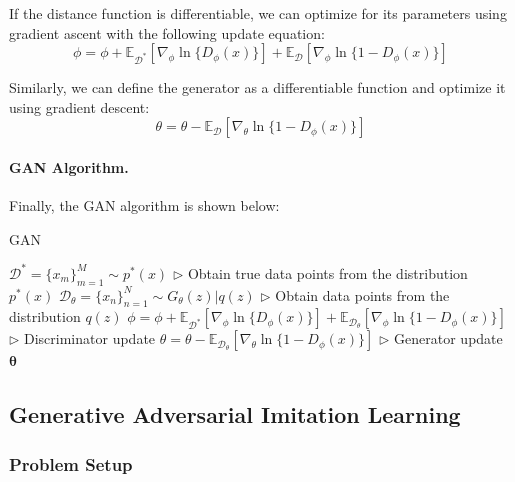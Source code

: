 \documentclass[11pt]{article}
\begin{document}
If the distance function is differentiable, we can optimize for its parameters using gradient ascent with the following update equation:
\begin{equation}
    \phi = \phi + \mathbb{E}_{\mathcal{D}^\ast} [\nabla_\phi \ln \{D_{\phi}(x)\} ]
    + \mathbb{E}_{\mathcal{D}}[\nabla_\phi \ln\{1 - D_\phi(x)\}]
\end{equation}

Similarly, we can define the generator as a differentiable function and optimize it using gradient descent:
\begin{equation}
    \theta = \theta - \mathbb{E}_{\mathcal{D}}[\nabla_\theta \ln\{1 - D_\phi(x)\}]
\end{equation}

\paragraph{GAN Algorithm.}

Finally, the GAN algorithm is shown below:

\begin{algorithm}[H]
    \label{algo:gan}
    \caption{GAN}
    \begin{algorithmic}[1]
    \State $\mathcal{D}^\ast = \{ x_m\}_{m=1}^M \sim p^\ast (x)$  \hfill $\triangleright$ Obtain true data points from the distribution $p^\ast(x)$
    \State $\mathcal{D}_\theta = \{ x_n\}_{n=1}^N \sim G_\theta (z) | q(z)$ \hfill $\triangleright$ Obtain data points from the distribution $q(z)$ 
    \State $\phi = \phi + \mathbb{E}_{\mathcal{D}^\ast} [\nabla_\phi \ln \{D_{\phi}(x)\} ]
    + \mathbb{E}_{\mathcal{D}_\theta}[\nabla_\phi \ln\{1 - D_\phi(x)\}]$ \hfill $\triangleright$ Discriminator update 
    \State $\theta = \theta - \mathbb{E}_{\mathcal{D}_\theta}[\nabla_\theta \ln\{1 - D_\phi(x)\}]$ \hfill $\triangleright$ Generator update 
    \EndFor \\
    \Return $\boldsymbol{\theta}$
    \EndFunction
    \end{algorithmic}
\end{algorithm}

\subsection{Generative Adversarial Imitation Learning}

\subsubsection{Problem Setup}
\end{document}
